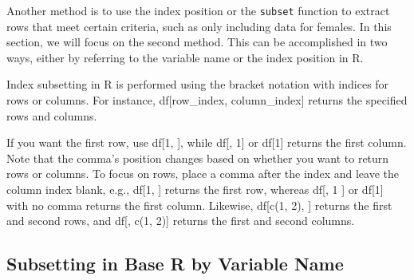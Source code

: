 \documentclass[
]{article}
\newenvironment{Shaded}{\begin{snugshade}}{\end{snugshade}}
\newcommand{\AttributeTok}[1]{\textcolor[rgb]{0.13,0.29,0.53}{#1}}
\newcommand{\CommentTok}[1]{\textcolor[rgb]{0.56,0.35,0.01}{\textit{#1}}}
\newcommand{\DecValTok}[1]{\textcolor[rgb]{0.00,0.00,0.81}{#1}}
\newcommand{\FunctionTok}[1]{\textcolor[rgb]{0.13,0.29,0.53}{\textbf{#1}}}
\newcommand{\NormalTok}[1]{#1}
\newcommand{\OtherTok}[1]{\textcolor[rgb]{0.56,0.35,0.01}{#1}}
\newcommand{\SpecialCharTok}[1]{\textcolor[rgb]{0.81,0.36,0.00}{\textbf{#1}}}
\newcommand{\StringTok}[1]{\textcolor[rgb]{0.31,0.60,0.02}{#1}}
\begin{document}
Another method is to use the index position or the \texttt{subset}
function to extract rows that meet certain criteria, such as only
including data for females. In this section, we will focus on the second
method. This can be accomplished in two ways, either by referring to the
variable name or the index position in R.

Index subsetting in R is performed using the bracket notation with
indices for rows or columns. For instance, df{[}row\_index,
column\_index{]} returns the specified rows and columns.

If you want the first row, use df{[}1, {]}, while df{[}, 1{]} or
df{[}1{]} returns the first column. Note that the comma's position
changes based on whether you want to return rows or columns. To focus on
rows, place a comma after the index and leave the column index blank,
e.g., df{[}1, {]} returns the first row, whereas df{[}, 1 {]} or
df{[}1{]} with no comma returns the first column. Likewise, df{[}c(1,
2), {]} returns the first and second rows, and df{[}, c(1, 2){]} returns
the first and second columns.

\hypertarget{subsetting-in-base-r-by-variable-name}{%
\subsection{Subsetting in Base R by Variable
Name}\label{subsetting-in-base-r-by-variable-name}}

\begin{Shaded}
\end{Shaded}
\end{document}

